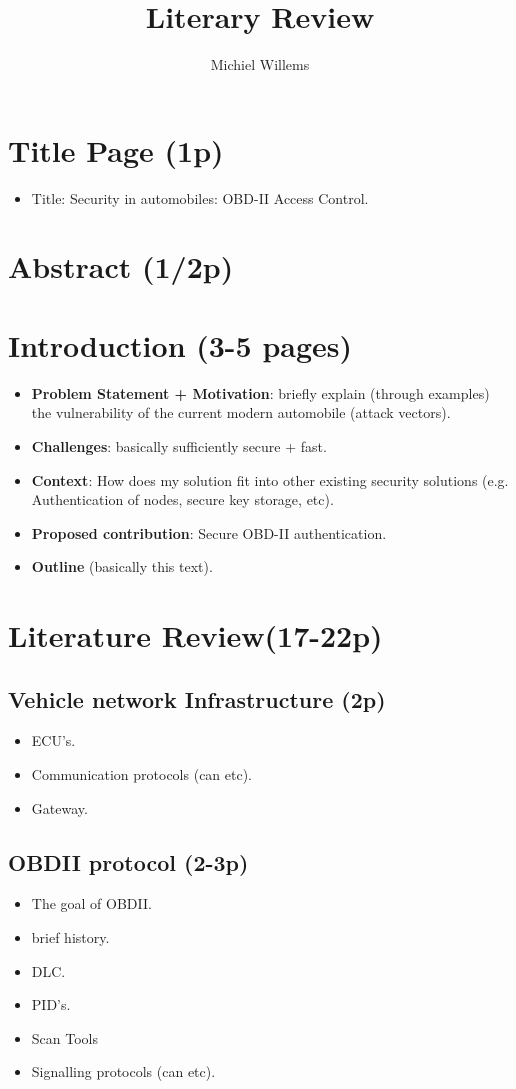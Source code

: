 \documentclass[11pt]{article}
\title{Literary Review}
\author{Michiel Willems}
\begin{document}
	
\section{Title Page (1p)}
\begin{itemize}
	\item Title: Security in automobiles: OBD-II Access Control.
\end{itemize}

\section{Abstract (1/2p)}

\section{Introduction (3-5 pages)}
\begin{itemize}
	\item \textbf{Problem Statement + Motivation}: briefly explain (through examples) the vulnerability of the current modern automobile (attack vectors).
	\item \textbf{Challenges}: basically sufficiently secure + fast.
	\item \textbf{Context}: How does my solution fit into other existing security solutions (e.g. Authentication of nodes, secure key storage, etc).
	\item \textbf{Proposed contribution}: Secure OBD-II authentication.
	\item \textbf{Outline} (basically this text).
\end{itemize}

\section{Literature Review(17-22p)}

\subsection{Vehicle network Infrastructure (2p)}
\begin{itemize}
	\item ECU's.
	\item Communication protocols (can etc).
	\item Gateway.
\end{itemize}

\subsection{OBDII protocol (2-3p)}
\begin{itemize}
	\item The goal of OBDII.
	\item brief history.
	\item DLC.
	\item PID's.
	\item Scan Tools
	\item Signalling protocols (can etc).
\end{itemize}
\end{document}
